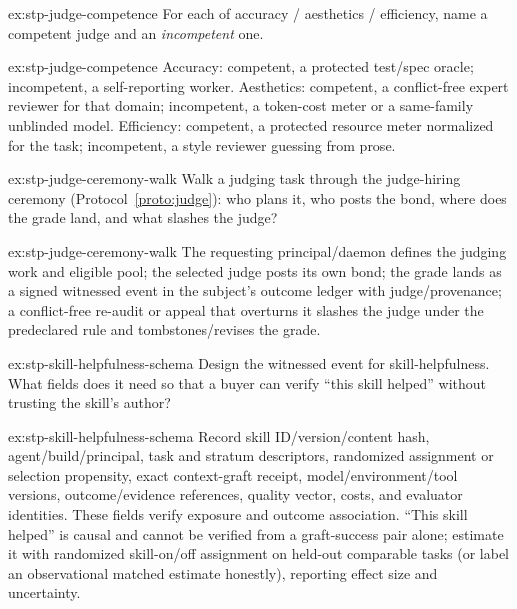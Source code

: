 \documentclass[11pt,a4paper]{article}
\theoremstyle{definition}
\begin{document}
\begin{pdexercise}[kind=Check,rating=1]{ex:stp-judge-competence}
For each of accuracy / aesthetics / efficiency, name a competent judge and an
\emph{incompetent} one.
\end{pdexercise}
\begin{pdsolution}{ex:stp-judge-competence}
Accuracy: competent, a protected test/spec oracle; incompetent, a
self-reporting worker. Aesthetics: competent, a conflict-free expert reviewer
for that domain; incompetent, a token-cost meter or a same-family unblinded
model. Efficiency: competent, a protected resource meter normalized for the
task; incompetent, a style reviewer guessing from prose.
\end{pdsolution}
\begin{pdexercise}[kind=Trace,rating=2]{ex:stp-judge-ceremony-walk}
Walk a judging task through the judge-hiring ceremony
(Protocol~\ref{proto:judge}): who plans it, who posts the bond, where does
the grade land, and what slashes the judge?
\end{pdexercise}
\begin{pdsolution}{ex:stp-judge-ceremony-walk}
The requesting principal/daemon defines the judging work and eligible pool;
the selected judge posts its own bond; the grade lands as a signed witnessed
event in the subject's outcome ledger with judge/provenance; a conflict-free
re-audit or appeal that overturns it slashes the judge under the
predeclared rule and tombstones/revises the grade.
\end{pdsolution}
\begin{pdexercise}[kind=Trace,rating=2]{ex:stp-skill-helpfulness-schema}
Design the witnessed event for skill-helpfulness. What fields does it need so
that a buyer can verify ``this skill helped'' without trusting the skill's
author?
\end{pdexercise}
\begin{pdsolution}{ex:stp-skill-helpfulness-schema}
Record skill ID/version/content hash, agent/build/principal, task and
stratum descriptors, randomized assignment or selection propensity, exact
context-graft receipt, model/environment/tool versions, outcome/evidence
references, quality vector, costs, and evaluator identities. These fields
verify exposure and outcome association. ``This skill helped'' is causal and
cannot be verified from a graft-success pair alone; estimate it with
randomized skill-on/off assignment on held-out comparable tasks (or label an
observational matched estimate honestly), reporting effect size and
uncertainty.
\end{pdsolution}
\end{document}
